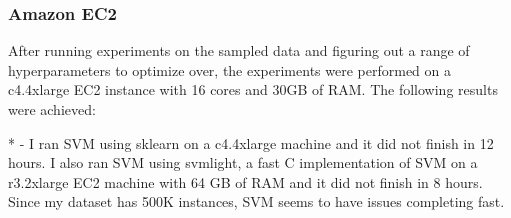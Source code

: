\documentclass{article} %
\begin{document}
\subsubsection{Amazon EC2}
After running experiments on the sampled data and figuring out a range of hyperparameters to optimize over, the experiments were performed on a c4.4xlarge EC2 instance with 16 cores and 30GB of RAM. The following results were achieved:

\begin{table}[H]
	\caption{Full dataset results}
	\begin{center}
	\end{center}
\end{table}

\footnotesize{* - I ran SVM using sklearn on a c4.4xlarge machine and it did not finish in 12 hours. I also ran SVM using svmlight, a fast C implementation of SVM on a r3.2xlarge EC2 machine with 64 GB of RAM and it did not finish in 8 hours. Since my dataset has 500K instances, SVM seems to have issues completing fast.}

\normalsize
\end{document}
